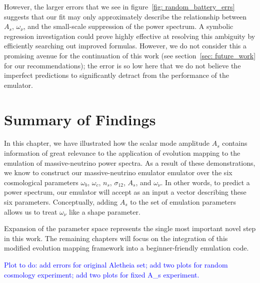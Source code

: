 However, the larger errors that we see in
figure~\ref{fig: random_battery_errs} suggests that our fit may only
approximately describe the relationship
between $A_s$, $\omega_\nu$, and the small-scale suppression of the power
spectrum. A symbolic regression investigation could prove highly effective at
resolving this ambiguity by efficiently searching out improved formulas. 
However, we do not consider this a promising avenue
for the continuation of this work (see section~\ref{sec: future_work} for our
recommendations); the error
is so low here that we do not believe the imperfect predictions to
significantly detract from the performance of the emulator.

\section{Summary of Findings}


In this chapter, we have illustrated how the scalar mode amplitude $A_s$
contains information of great relevance to the application of evolution
mapping to the emulation of massive-neutrino power spectra. As a result of 
these demonstrations, we know to construct 
our massive-neutrino emulator emulator over the six cosmological
parameters $\omega_b$, $\omega_c$, $n_s$, $\sigma_{12}$, $A_s$, and
$\omega_\nu$. In other words, to predict a power
spectrum, our emulator will accept as an input a vector describing
these six parameters. Conceptually, adding $A_s$ to the set of
emulation parameters allows us to treat $\omega_\nu$ like a shape
parameter.

Expansion of the parameter space represents the single most 
important novel step in this work. The remaining chapters will
focus on the integration of this modified evolution mapping framework
into a beginner-friendly emulation code.

\textcolor{blue}{Plot to do: add errors for original Aletheia set; add two
plots for random cosmology experiment; add two plots for fixed
A\_s experiment.}
